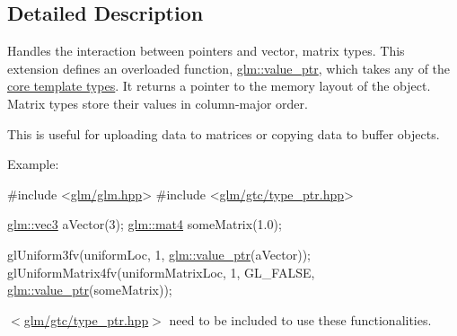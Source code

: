 \subsection{Detailed Description}
Handles the interaction between pointers and vector, matrix types. This extension defines an overloaded function, \hyperlink{group__gtc__type__ptr_gaf019636bb8bd7c9efb7c7ce3bb23bcfc}{glm\-::value\-\_\-ptr}, which takes any of the \hyperlink{group__core__template}{core template types}. It returns a pointer to the memory layout of the object. Matrix types store their values in column-\/major order.

This is useful for uploading data to matrices or copying data to buffer objects.

Example\-: 
\begin{DoxyCode}
\textcolor{preprocessor}{#include <\hyperlink{glm_8hpp}{glm/glm.hpp}>}
\textcolor{preprocessor}{#include <\hyperlink{type__ptr_8hpp}{glm/gtc/type\_ptr.hpp}>}

\hyperlink{structglm_1_1detail_1_1tvec3}{glm::vec3} aVector(3);
\hyperlink{structglm_1_1detail_1_1tmat4x4}{glm::mat4} someMatrix(1.0);

glUniform3fv(uniformLoc, 1, \hyperlink{group__gtc__type__ptr_gaf019636bb8bd7c9efb7c7ce3bb23bcfc}{glm::value\_ptr}(aVector));
glUniformMatrix4fv(uniformMatrixLoc, 1, GL\_FALSE, \hyperlink{group__gtc__type__ptr_gaf019636bb8bd7c9efb7c7ce3bb23bcfc}{glm::value\_ptr}(someMatrix));
\end{DoxyCode}


$<$\hyperlink{type__ptr_8hpp}{glm/gtc/type\-\_\-ptr.\-hpp}$>$ need to be included to use these functionalities. 

